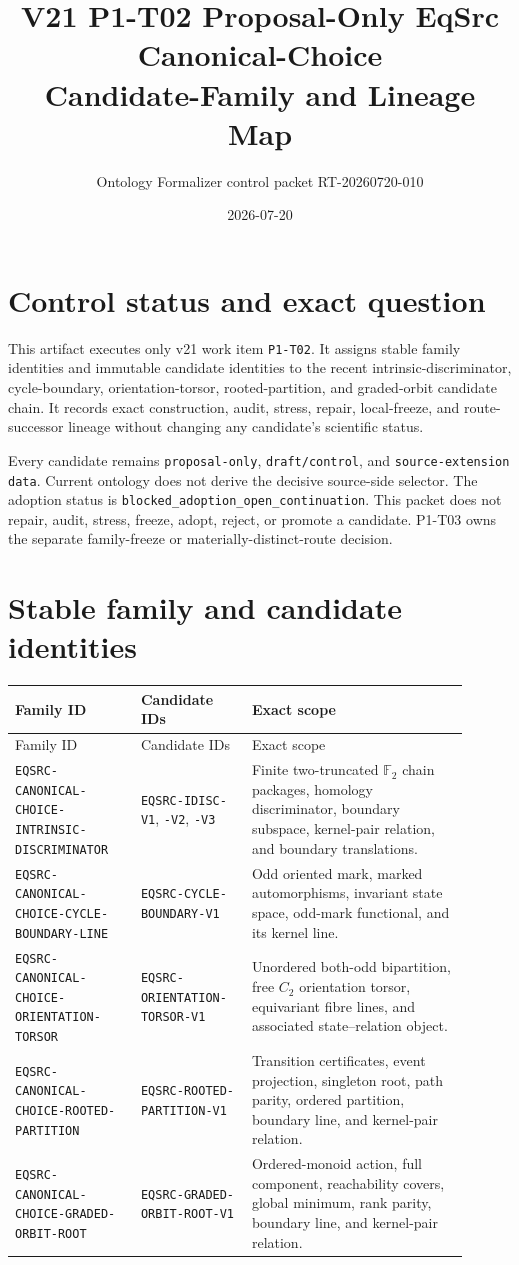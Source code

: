 \documentclass[11pt]{article}
\title{V21 P1-T02 Proposal-Only EqSrc Canonical-Choice\\
Candidate-Family and Lineage Map}
\author{Ontology Formalizer control packet RT-20260720-010}
\date{2026-07-20}
\newcommand{\Ftwo}{\mathbb F_2}
\begin{document}
\maketitle

\section{Control status and exact question}

This artifact executes only v21 work item \texttt{P1-T02}. It assigns stable
family identities and immutable candidate identities to the recent
intrinsic-discriminator, cycle-boundary, orientation-torsor,
rooted-partition, and graded-orbit candidate chain. It records exact
construction, audit, stress, repair, local-freeze, and route-successor
lineage without changing any candidate's scientific status.

Every candidate remains \texttt{proposal-only}, \texttt{draft/control}, and
\texttt{source-extension data}. Current ontology does not derive the
decisive source-side selector. The adoption status is
\texttt{blocked\_adoption\_open\_continuation}. This packet does not repair,
audit, stress, freeze, adopt, reject, or promote a candidate. P1-T03 owns the
separate family-freeze or materially-distinct-route decision.

\section{Stable family and candidate identities}

\begin{longtable}{p{0.25\linewidth}p{0.22\linewidth}p{0.43\linewidth}}
\toprule
Family ID & Candidate IDs & Exact scope \\
\midrule
\endfirsthead
\toprule
Family ID & Candidate IDs & Exact scope \\
\midrule
\endhead
\texttt{EQSRC-CANONICAL-CHOICE-INTRINSIC-DISCRIMINATOR} &
\texttt{EQSRC-IDISC-V1}, \texttt{-V2}, \texttt{-V3} &
Finite two-truncated $\Ftwo$ chain packages, homology discriminator,
boundary subspace, kernel-pair relation, and boundary translations. \\
\texttt{EQSRC-CANONICAL-CHOICE-CYCLE-BOUNDARY-LINE} &
\texttt{EQSRC-CYCLE-BOUNDARY-V1} &
Odd oriented mark, marked automorphisms, invariant state space, odd-mark
functional, and its kernel line. \\
\texttt{EQSRC-CANONICAL-CHOICE-ORIENTATION-TORSOR} &
\texttt{EQSRC-ORIENTATION-TORSOR-V1} &
Unordered both-odd bipartition, free $C_2$ orientation torsor, equivariant
fibre lines, and associated state--relation object. \\
\texttt{EQSRC-CANONICAL-CHOICE-ROOTED-PARTITION} &
\texttt{EQSRC-ROOTED-PARTITION-V1} &
Transition certificates, event projection, singleton root, path parity,
ordered partition, boundary line, and kernel-pair relation. \\
\texttt{EQSRC-CANONICAL-CHOICE-GRADED-ORBIT-ROOT} &
\texttt{EQSRC-GRADED-ORBIT-ROOT-V1} &
Ordered-monoid action, full component, reachability covers, global minimum,
rank parity, boundary line, and kernel-pair relation. \\
\bottomrule
\end{longtable}
\end{document}
